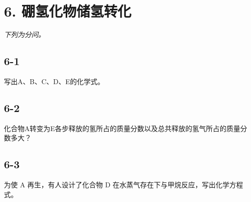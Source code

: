 \section*{6. 硼氢化物储氢转化}
\textit{下列为分问。}

\subsection*{6-1}
写出A、B、C、D、E的化学式。

\subsection*{6-2}
化合物A转变为E各步释放的氢所占的质量分数以及总共释放的氢⽓所占的质量分数多⼤？

\subsection*{6-3}
为使 A 再⽣，有⼈设计了化合物 D 在⽔蒸⽓存在下与甲烷反应，写出化学⽅程式。
